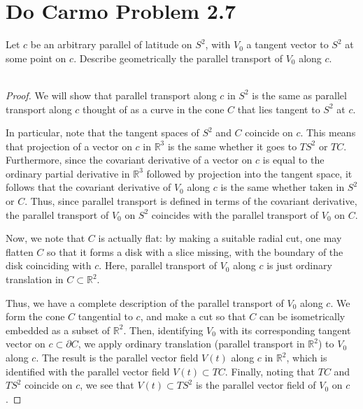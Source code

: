 \documentclass[fontsize=11pt]{scrartcl} %
\numberwithin{equation}{section} %
\numberwithin{figure}{section} %
\numberwithin{table}{section} %
\newcommand{\R}{\mathbb{R}}
\begin{document}
\section{Do Carmo Problem 2.7}
Let $c$ be an arbitrary parallel of latitude on $S^2$, with $V_0$ a tangent
vector to $S^2$ at some point on $c$. Describe geometrically the parallel
transport of $V_0$ along $c$.
\\
\\
\begin{proof}
    We will show that parallel transport along $c$ in $S^2$ is the same as
    parallel transport along $c$ thought of as a curve in the cone $C$ that lies
    tangent to $S^2$ at $c$.

    In particular, note that the tangent spaces of $S^2$ and $C$ coincide on
    $c$. This means that projection of a vector on $c$ in $\R^3$ is the same
    whether it goes to $TS^2$ or $TC$. Furthermore, since the covariant
    derivative of a vector on $c$ is equal to the ordinary partial derivative in
    $\R^3$ followed by projection into the tangent space, it follows that the
    covariant derivative of $V_0$ along $c$ is the same whether taken in $S^2$
    or $C$. Thus, since parallel transport is defined in terms of the covariant
    derivative, the parallel transport of $V_0$ on $S^2$ coincides with the
    parallel transport of $V_0$ on $C$.

    Now, we note that $C$ is actually flat: by making a suitable radial cut, one
    may flatten $C$ so that it forms a disk with a slice missing, with the
    boundary of the disk coinciding with $c$. Here, parallel transport of $V_0$
    along $c$ is just ordinary translation in $C\subset \R^2$.

    Thus, we have a complete description of the parallel transport of $V_0$
    along $c$. We form the cone $C$ tangential to $c$, and make a cut so that
    $C$ can be isometrically embedded as a subset of $\R^2$. Then, identifying
    $V_0$ with its corresponding tangent vector on $c \subset \partial C$, we
    apply ordinary translation (parallel transport in $\R^2$) to $V_0$ along
    $c$. The result is the parallel vector field $V(t)$ along $c$ in $\R^2$,
    which is identified with the parallel vector field $V(t)\subset TC$.
    Finally, noting that $TC$ and $TS^2$ coincide on $c$, we see that
    $V(t)\subset TS^2$ is the parallel vector field of $V_0$ on $c$.
\end{proof}
\end{document}
